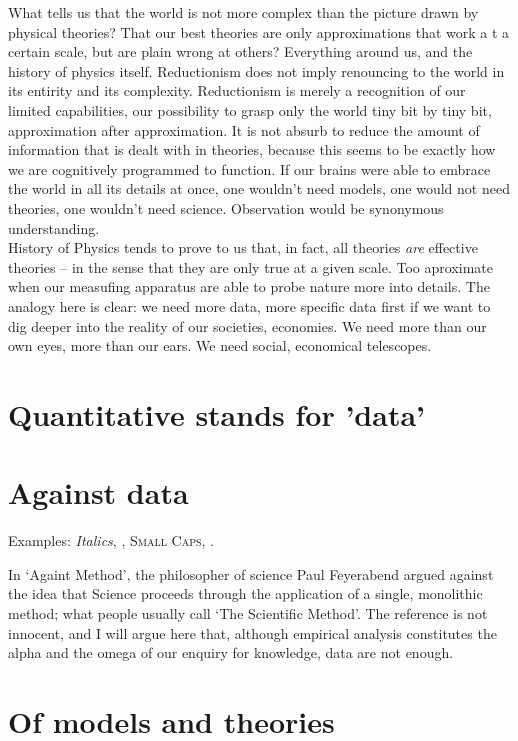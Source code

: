 What tells us that the world is not more complex than the picture drawn by
physical theories? That our best theories are only approximations that work a t
a certain scale, but are plain wrong at others? Everything around us, and the
history of physics itself. Reductionism does not imply renouncing to the world
in its entirity and its complexity. Reductionism is merely a recognition of our
limited capabilities, our possibility to grasp only the world tiny bit by tiny
bit, approximation after approximation. It is not absurb to reduce the amount of
information that is dealt with in theories, because this seems to be exactly how
we are cognitively programmed to function. If our brains were able to embrace
the world in all its details at once, one wouldn't need models, one would not
need theories, one wouldn't need science. Observation would be synonymous 
understanding.\\
History of Physics tends to prove to us that, in fact, all theories \emph{are}
effective theories -- in the sense that they are only true at a given scale. Too
aproximate when our measufing apparatus are able to probe nature more into
details. The analogy here is clear: we need more data, more specific data first
if we want to dig deeper into the reality of our societies, economies. We need
more than our own eyes, more than our ears. We need social, economical
telescopes.

\section{Quantitative stands for 'data'}
\label{sec:quantitative_stands_for_data_}

\section{Against data}
\label{sec:against_data}

Examples: \textit{Italics}, , \textsc{Small
Caps}, .

In `Againt Method', the philosopher of science Paul Feyerabend argued against
the idea that Science proceeds through the application of a single, monolithic
method; what people usually call `The Scientific Method'. The reference is not
innocent, and I will argue here that, although empirical analysis constitutes
the alpha and the omega of our enquiry for knowledge, data are not enough.  

\section{Of models and theories}

